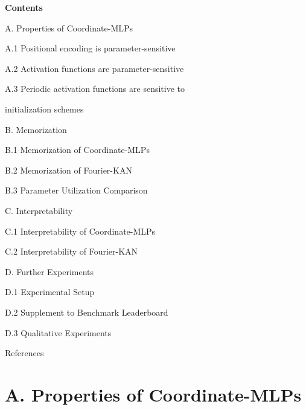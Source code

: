 \documentclass[letterpaper]{article} %
\begin{document}



\newpage
\clearpage
\begin{center}
\textbf{Contents}
\end{center}

A. Properties of Coordinate-MLPs 

    \qquad A.1 Positional encoding is parameter-sensitive
    
    \qquad A.2 Activation functions are parameter-sensitive
    
    \qquad A.3 Periodic activation functions are sensitive to
    
    \qquad \quad initialization schemes

B. Memorization
    
    \qquad B.1 Memorization of Coordinate-MLPs
    
    \qquad B.2 Memorization of Fourier-KAN
    
    \qquad B.3 Parameter Utilization Comparison

C. Interpretability

    \qquad C.1 Interpretability of Coordinate-MLPs
    
    \qquad C.2 Interpretability of Fourier-KAN

D. Further Experiments

    \qquad D.1 Experimental Setup

    \qquad D.2 Supplement to Benchmark Leaderboard

    \qquad D.3 Qualitative Experiments
    
References

\section{A. Properties of Coordinate-MLPs}
\end{document}
